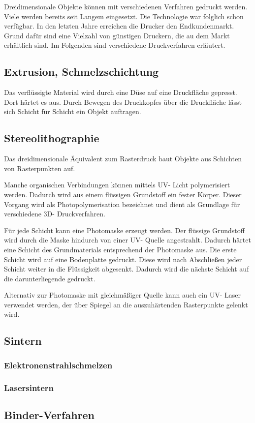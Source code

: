 Dreidimensionale Objekte können mit verschiedenen Verfahren gedruckt werden. Viele werden bereits seit Langem eingesetzt. Die Technologie war folglich schon verfügbar. In den letzten Jahre erreichen die Drucker den Endkundenmarkt. Grund dafür sind eine Vielzahl von günstigen Druckern, die au dem Markt erhältlich sind. Im Folgenden sind verschiedene Druckverfahren erläutert.

\subsection{Extrusion, Schmelzschichtung}
Das verflüssigte Material wird durch eine Düse auf eine Druckfläche gepresst. Dort härtet es aus. Durch Bewegen des Druckkopfes über die Druckfläche lässt sich Schicht für Schicht ein Objekt auftragen.



\subsection{Stereolithographie}

Das dreidimensionale Äquivalent zum Rasterdruck baut Objekte aus Schichten von Rasterpunkten auf.

Manche organischen Verbindungen können mittels \ac{UV}- Licht polymerisiert werden. Dadurch wird aus einem flüssigen Grundstoff ein fester Körper. Dieser Vorgang wird als Photopolymerisation bezeichnet und dient als Grundlage für verschiedene \ac{3D}- Druckverfahren. 

Für jede Schicht kann eine Photomaske erzeugt werden. Der flüssige Grundstoff wird durch die Maske hindurch von einer \ac{UV}- Quelle angestrahlt. Dadurch härtet eine Schicht des Grundmaterials entsprechend der Photomaske aus. Die erste Schicht wird auf eine Bodenplatte gedruckt. Diese wird nach Abschließen jeder Schicht weiter in die Flüssigkeit abgesenkt. Dadurch wird die nächste Schicht auf die darunterliegende gedruckt.


Alternativ zur Photomaske mit gleichmäßiger Quelle kann auch ein \ac{UV}- Laser verwendet werden, der über Spiegel an die auszuhärtenden Rasterpunkte gelenkt wird.


\subsection{Sintern}

	\subsubsection{Elektronenstrahlschmelzen}
	\subsubsection{Lasersintern}

\subsection{Binder-Verfahren}